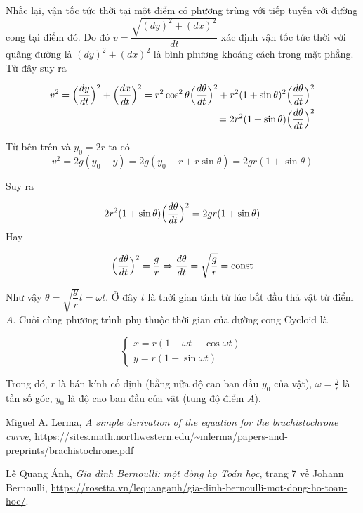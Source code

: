 \documentclass{article}
\begin{document}
Nhắc lại, vận tốc tức thời tại một điểm có phương trùng với tiếp tuyến với đường cong tại điểm đó. Do đó $v = \dfrac{\sqrt{(dy)^2 + (dx)^2}}{dt}$ xác định vận tốc tức thời với quãng đường là $(dy)^2 + (dx)^2$ là bình phương khoảng cách trong mặt phẳng. Từ đây suy ra

\begin{align*}
	v^2 = \Bigl(\frac{dy}{dt}\Bigr)^2 + \Bigl(\frac{dx}{dt}\Bigr)^2 = r^2 \cos^2 \theta \Bigl( \frac{d \theta}{dt} \Bigr)^2 + r^2 (1 + \sin \theta)^2 \Bigl( \frac{d \theta}{dt} \Bigr)^2 \\ = 2 r^2 (1 + \sin \theta) \Bigl( \frac{d \theta}{dt} \Bigr)^2
\end{align*}

Từ bên trên và $y_0 = 2r$ ta có \[v^2 = 2 g (y_0 - y) = 2 g (y_0 - r + r \sin \theta) = 2 g r ( 1 + \sin \theta)\]

Suy ra

\begin{equation*}
	2 r^2 (1 + \sin \theta) \Bigl( \frac{d \theta}{dt} \Bigr)^2 = 2 g r (1 + \sin \theta)
\end{equation*}
Hay

\begin{equation}
	\Bigl(\frac{d \theta}{dt}\Bigr)^2 = \frac{g}{r} \Rightarrow \frac{d \theta}{dt} = \sqrt{\frac{g}{r}} = \text{const}
\end{equation}

Như vậy $\theta = \sqrt{\dfrac{g}{r}} t = \omega t$. Ở đây $t$ là thời gian tính từ lúc bắt đầu thả vật từ điểm $A$. Cuối cùng phương trình phụ thuộc thời gian của đường cong Cycloid là

\begin{equation}
	\begin{cases}
		x = r (1 + \omega t - \cos \omega t) \\ y = r (1 - \sin \omega t)
	\end{cases}
\end{equation}

Trong đó, $r$ là bán kính cố định (bằng nửa độ cao ban đầu $y_0$ của vật), $\omega = \frac{g}{r}$ là tần số góc, $y_0$ là độ cao ban đầu của vật (tung độ điểm $A$).

\begin{thebibliography}{9}
	Miguel A. Lerma, \emph{A simple derivation of the equation for the brachistochrone curve}, \url{https://sites.math.northwestern.edu/~mlerma/papers-and-preprints/brachistochrone.pdf}
	
	Lê Quang Ánh, \emph{Gia đình Bernoulli: một dòng họ Toán học}, trang 7 về Johann Bernoulli, \url{https://rosetta.vn/lequanganh/gia-dinh-bernoulli-mot-dong-ho-toan-hoc/}.
\end{thebibliography}
\end{document}
